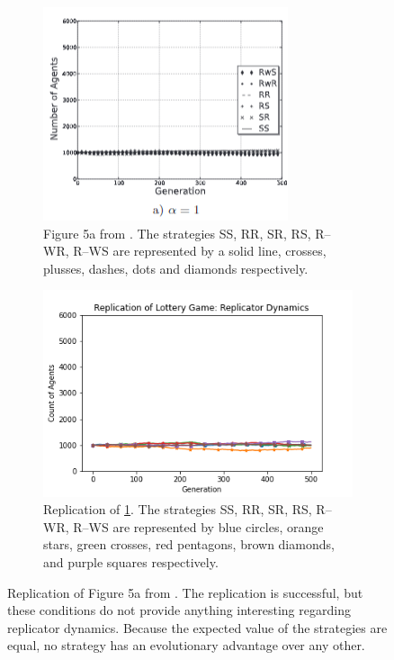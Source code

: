\FloatBarrier 
\begin{figure}[!h]
  \begin{subfigure}[b]{0.45\textwidth}
    \includegraphics[width=\textwidth]{images/lottery1.png}
    \caption{Figure 5a from \cite{RN30}. The strategies SS, RR, SR, RS, R--WR, R--WS are represented by a solid line, crosses, plusses, dashes, dots and diamonds respectively. }
    \label{lottery1}
  \end{subfigure}
  \hfill
  \begin{subfigure}[b]{0.45\textwidth}
    \includegraphics[width=1.25\textwidth]{images/lottery1_me.png}
    \caption{Replication of \ref{lottery1}. The strategies SS, RR, SR, RS, R--WR, R--WS are represented by blue circles, orange stars, green crosses, red pentagons, brown diamonds, and purple squares respectively.}
    \label{lottery1_me}
  \end{subfigure}
  \caption{Replication of Figure 5a from \cite{RN30}. The replication is successful, but these conditions do not provide anything interesting regarding replicator dynamics. Because the expected value of the strategies are equal, no strategy has an evolutionary advantage over any other.} \label{lottery_comp0}
\end{figure} 
\FloatBarrier

